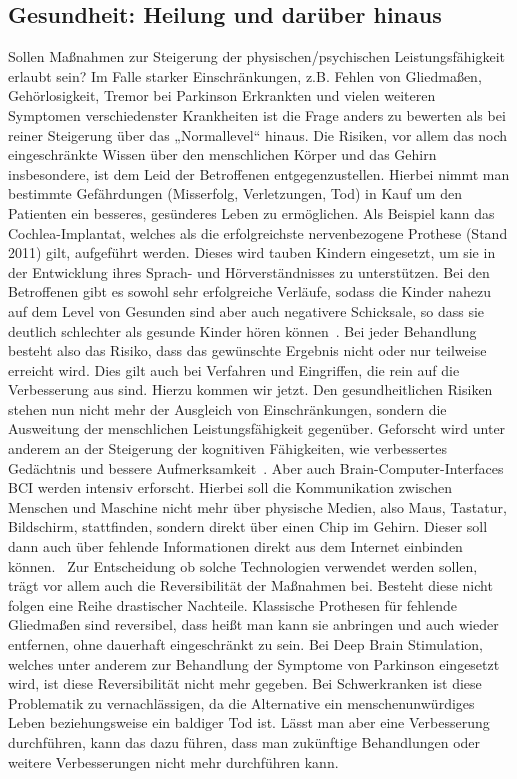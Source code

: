 \documentclass[a4paper,
DIV=13,
12pt,
BCOR=10mm,
department=FakEI,
twoside,
parskip=half,
automark,
]{OTHRartcl}
\begin{document}
\subsection*{Gesundheit: Heilung und darüber hinaus}
Sollen Maßnahmen zur Steigerung der physischen/psychischen Leistungsfähigkeit erlaubt sein? Im Falle starker Einschränkungen, z.B. Fehlen von Gliedmaßen, Gehörlosigkeit, Tremor bei Parkinson Erkrankten und vielen weiteren
Symptomen verschiedenster Krankheiten ist die Frage anders zu bewerten als bei reiner Steigerung über das „Normallevel“ hinaus. Die Risiken, vor allem das noch eingeschränkte Wissen über den menschlichen Körper und das Gehirn
insbesondere, ist dem Leid der Betroffenen entgegenzustellen. Hierbei nimmt man bestimmte Gefährdungen (Misserfolg, Verletzungen, Tod) in Kauf um den Patienten ein besseres, gesünderes Leben zu ermöglichen. Als Beispiel kann das
Cochlea-Implantat, welches als die erfolgreichste nervenbezogene Prothese (Stand 2011) gilt, aufgeführt werden. Dieses wird tauben Kindern eingesetzt, um sie in der Entwicklung ihres Sprach- und Hörverständnisses zu unterstützen.
Bei den Betroffenen gibt es sowohl sehr erfolgreiche Verläufe, sodass die Kinder nahezu auf dem Level von Gesunden sind aber auch negativere Schicksale, so dass sie deutlich schlechter als gesunde Kinder hören können~\cite{lee2016cochlear}. 
Bei jeder Behandlung besteht also das Risiko, dass das gewünschte Ergebnis nicht oder nur teilweise erreicht wird. Dies gilt auch bei Verfahren und Eingriffen, die rein auf die Verbesserung aus sind. Hierzu kommen wir jetzt.
Den gesundheitlichen Risiken stehen nun nicht mehr der Ausgleich von Einschränkungen, sondern die Ausweitung der menschlichen Leistungsfähigkeit gegenüber. Geforscht wird unter anderem an der Steigerung der kognitiven Fähigkeiten,
wie verbessertes Gedächtnis und bessere Aufmerksamkeit~\cite{SUTHANA2014996}. Aber auch Brain-Computer-Interfaces BCI werden intensiv erforscht. Hierbei soll die Kommunikation zwischen Menschen und Maschine nicht mehr über physische Medien,
also Maus, Tastatur, Bildschirm, stattfinden, sondern direkt über einen Chip im Gehirn. Dieser soll dann auch über fehlende Informationen direkt aus dem Internet einbinden können.~\cite{neuralink} Zur Entscheidung ob solche Technologien verwendet
werden sollen, trägt vor allem auch die Reversibilität der Maßnahmen bei. Besteht diese nicht folgen eine Reihe drastischer Nachteile. Klassische Prothesen für fehlende Gliedmaßen sind reversibel, dass heißt man kann sie anbringen und auch wieder
entfernen, ohne dauerhaft eingeschränkt zu sein. Bei Deep Brain Stimulation, welches unter anderem zur Behandlung der Symptome von Parkinson eingesetzt wird, ist diese Reversibilität nicht mehr gegeben. Bei Schwerkranken ist diese Problematik zu
vernachlässigen, da die Alternative ein menschenunwürdiges Leben beziehungsweise ein baldiger Tod ist. Lässt man aber eine Verbesserung durchführen, kann das dazu führen, dass man zukünftige Behandlungen oder weitere Verbesserungen nicht mehr durchführen kann.
\end{document}
